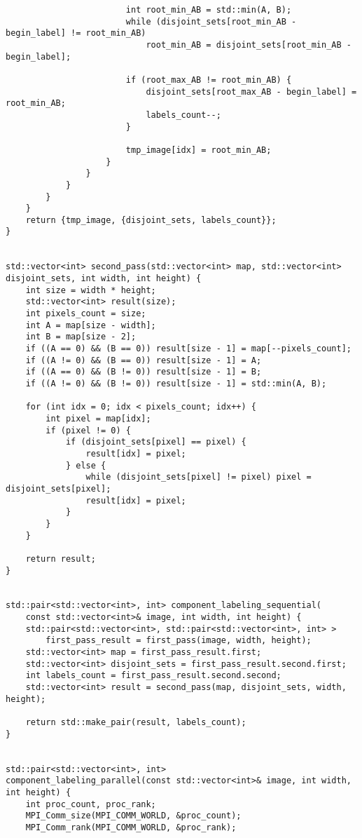 \documentclass{report}
\begin{document}
\begin{lstlisting}
                        int root_min_AB = std::min(A, B);
                        while (disjoint_sets[root_min_AB - begin_label] != root_min_AB)
                            root_min_AB = disjoint_sets[root_min_AB - begin_label];

                        if (root_max_AB != root_min_AB) {
                            disjoint_sets[root_max_AB - begin_label] = root_min_AB;
                            labels_count--;
                        }

                        tmp_image[idx] = root_min_AB;
                    }
                }
            }
        }
    }
    return {tmp_image, {disjoint_sets, labels_count}};
}


std::vector<int> second_pass(std::vector<int> map, std::vector<int> disjoint_sets, int width, int height) {
    int size = width * height;
    std::vector<int> result(size);
    int pixels_count = size;
    int A = map[size - width];
    int B = map[size - 2];
    if ((A == 0) && (B == 0)) result[size - 1] = map[--pixels_count];
    if ((A != 0) && (B == 0)) result[size - 1] = A;
    if ((A == 0) && (B != 0)) result[size - 1] = B;
    if ((A != 0) && (B != 0)) result[size - 1] = std::min(A, B);

    for (int idx = 0; idx < pixels_count; idx++) {
        int pixel = map[idx];
        if (pixel != 0) {
            if (disjoint_sets[pixel] == pixel) {
                result[idx] = pixel;
            } else {
                while (disjoint_sets[pixel] != pixel) pixel = disjoint_sets[pixel];
                result[idx] = pixel;
            }
        }
    }

    return result;
}


std::pair<std::vector<int>, int> component_labeling_sequential(
    const std::vector<int>& image, int width, int height) {
    std::pair<std::vector<int>, std::pair<std::vector<int>, int> >
        first_pass_result = first_pass(image, width, height);
    std::vector<int> map = first_pass_result.first;
    std::vector<int> disjoint_sets = first_pass_result.second.first;
    int labels_count = first_pass_result.second.second;
    std::vector<int> result = second_pass(map, disjoint_sets, width, height);

    return std::make_pair(result, labels_count);
}


std::pair<std::vector<int>, int>
component_labeling_parallel(const std::vector<int>& image, int width, int height) {
    int proc_count, proc_rank;
    MPI_Comm_size(MPI_COMM_WORLD, &proc_count);
    MPI_Comm_rank(MPI_COMM_WORLD, &proc_rank);


\end{lstlisting}
\end{document}
